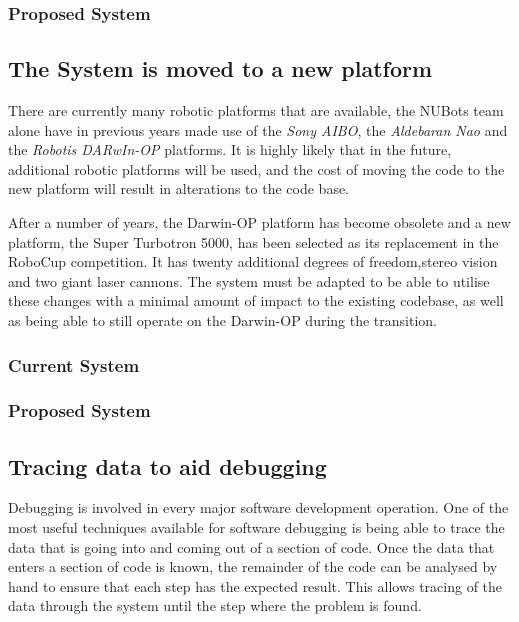 \documentclass[english,12pt]{scrartcl}
\begin{document}
            \subsubsection{Proposed System}
        
        \subsection{The System is moved to a new platform}
            There are currently many robotic platforms that are available, the NUBots team alone
            have in previous years made use of the \emph{Sony AIBO}, the \emph{Aldebaran Nao} and
            the \emph{Robotis DARwIn-OP} platforms. It is highly likely that in the future,
            additional robotic platforms will be used, and the cost of moving the code to the new
            platform will result in alterations to the code base.
            
            After a number of years, the Darwin-OP platform has become obsolete and a new platform,
            the Super Turbotron 5000, has been selected as its replacement in the RoboCup
            competition. It has twenty additional degrees of freedom,stereo vision and two giant
            laser cannons. The system must be adapted to be able to utilise these changes with a
            minimal amount of impact to the existing codebase, as well as being able to still
            operate on the Darwin-OP during the transition.
            
            \subsubsection{Current System}
            \subsubsection{Proposed System}
                            
        \subsection{Tracing data to aid debugging}
            Debugging is involved in every major software development operation. One of the most
            useful techniques available for software debugging is being able to trace the data that
            is going into and coming out of a section of code. Once the data that enters a section
            of code is known, the remainder of the code can be analysed by hand to ensure that each
            step has the expected result. This allows tracing of the data through the system until
            the step where the problem is found.
            
\end{document}
